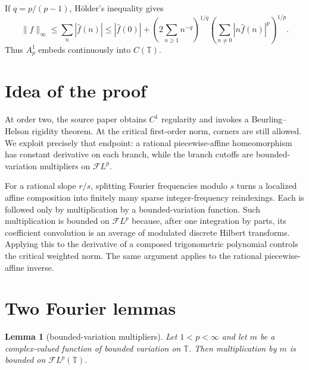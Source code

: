 \documentclass[11pt]{article}
\newtheorem{lemma}{Lemma}
\newcommand{\T}{\mathbb T}
\newcommand{\FL}{\mathcal F L}
\begin{document}
If $q=p/(p-1)$, H\"older's inequality gives
\begin{equation}\label{eq:embedding}
 \|f\|_\infty
 \le \sum_n|\widehat f(n)|
 \le |\widehat f(0)|+
 \left(2\sum_{n\ge1}n^{-q}\right)^{1/q}
 \left(\sum_{n\ne0}|n\widehat f(n)|^p\right)^{1/p}.
\end{equation}
Thus $A_p^1$ embeds continuously into $C(\T)$.

\section{Idea of the proof}

At order two, the source paper obtains $C^1$ regularity and invokes a
Beurling--Helson rigidity theorem.  At the critical first-order norm, corners
are still allowed.  We exploit precisely that endpoint: a rational
piecewise-affine homeomorphism has constant derivative on each branch, while
the branch cutoffs are bounded-variation multipliers on $\FL^p$.

For a rational slope $r/s$, splitting Fourier frequencies modulo $s$ turns a
localized affine composition into finitely many sparse integer-frequency
reindexings.  Each is followed only by multiplication by a bounded-variation
function.  Such multiplication is bounded on $\FL^p$ because, after one
integration by parts, its coefficient convolution is an average of modulated
discrete Hilbert transforms.  Applying this to the derivative of a composed
trigonometric polynomial controls the critical weighted norm.  The same
argument applies to the rational piecewise-affine inverse.

\section{Two Fourier lemmas}

\begin{lemma}[bounded-variation multipliers]\label{lem:bv}
Let $1<p<\infty$ and let $m$ be a complex-valued function of bounded
variation on $\T$.  Then multiplication by $m$ is bounded on $\FL^p(\T)$.
\end{lemma}
\end{document}
